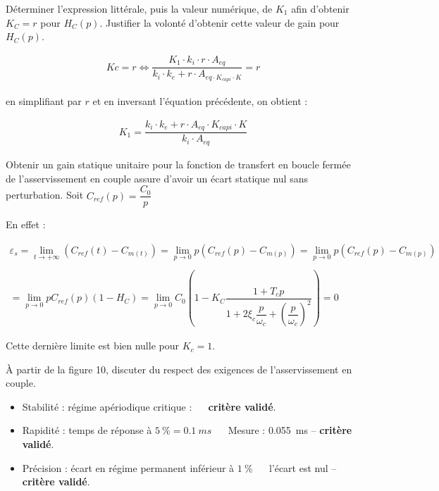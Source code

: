 \documentclass[11pt]{article}
\begin{document}
\UPSTIquestion  Déterminer l'expression littérale, puis la valeur numérique, de $K_{1}$ afin d'obtenir $K_{C}=r$ pour $H_{C}(p)$. Justifier la volonté d'obtenir cette valeur de gain pour $H_{C}(p)$.
\begin{UPSTIcorrige}
\begin{align*}
Kc=r \Leftrightarrow \dfrac{K_1\cdot k_i\cdot r\cdot A_{eq}}{k_i\cdot k_e+r\cdot A_{eq\cdot K_{capi}\cdot K}}=r
\end{align*}

en simplifiant par $r$ et en inversant l'équation précédente, on obtient : 

\begin{align*}
K_1=\dfrac{k_i\cdot k_e+r\cdot A_{eq}\cdot K_{capi}\cdot K}{k_i\cdot A_{eq}}
\end{align*}

Obtenir un gain statique unitaire pour la fonction de transfert en boucle fermée de l'asservissement en couple assure d'avoir un écart statique nul sans perturbation.
Soit $C_{ref}(p)=\dfrac{C_0}{p}$

En effet : 

\begin{align*}
\varepsilon_s=\lim_{t\rightarrow+\infty}  \left(C_{ref}(t)-C_{m(t)}\right)=\lim_{p\rightarrow 0} p \left(C_{ref}(p)-C_{m(p)}\right)=\lim_{p\rightarrow 0} p \left(C_{ref}(p)-C_{m(p)}\right)\\
\\
=\lim_{p\rightarrow 0} p C_{ref}(p) \left(1-H_C\right)=\lim_{p\rightarrow 0} C_{0} \left(1-K_C\dfrac{1+T_c p}{1+2\xi_c\dfrac{p}{\omega_c}+\left(\dfrac{p}{\omega_c}\right)^2}\right)=0
\end{align*}

Cette dernière limite est bien nulle pour $K_c=1$.

%
\end{UPSTIcorrige}


\UPSTIquestion À partir de la figure 10, discuter du respect des exigences de l'asservissement en couple.
\begin{UPSTIcorrige}
\begin{itemize}
\item Stabilité : régime apériodique critique : $\quad$ \textbf{critère validé}.
\item Rapidité : temps de réponse à $\SI{5}{\%} =\SI{0,1}{ms}$ $\quad$ Mesure : \SI{0,055}{ms} --  \textbf{critère validé}.
\item Précision : écart en régime permanent inférieur à $\SI{1}{\%}$ $\quad$ l'écart est nul -- \textbf{critère validé}.
\end{itemize}
\end{UPSTIcorrige}
\end{document}
